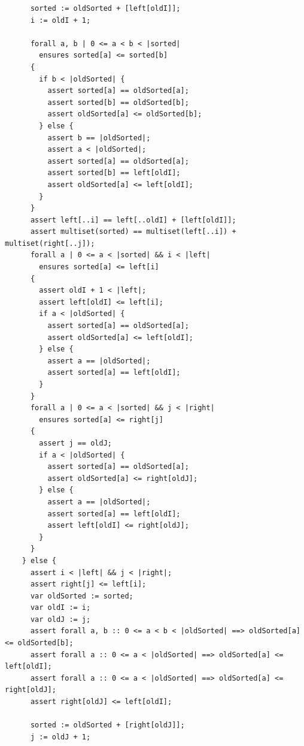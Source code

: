 \documentclass{article}
\begin{document}
\begin{lstlisting}
      sorted := oldSorted + [left[oldI]];
      i := oldI + 1;

      forall a, b | 0 <= a < b < |sorted|
        ensures sorted[a] <= sorted[b]
      {
        if b < |oldSorted| {
          assert sorted[a] == oldSorted[a];
          assert sorted[b] == oldSorted[b];
          assert oldSorted[a] <= oldSorted[b];
        } else {
          assert b == |oldSorted|;
          assert a < |oldSorted|;
          assert sorted[a] == oldSorted[a];
          assert sorted[b] == left[oldI];
          assert oldSorted[a] <= left[oldI];
        }
      }
      assert left[..i] == left[..oldI] + [left[oldI]];
      assert multiset(sorted) == multiset(left[..i]) + multiset(right[..j]);
      forall a | 0 <= a < |sorted| && i < |left|
        ensures sorted[a] <= left[i]
      {
        assert oldI + 1 < |left|;
        assert left[oldI] <= left[i];
        if a < |oldSorted| {
          assert sorted[a] == oldSorted[a];
          assert oldSorted[a] <= left[oldI];
        } else {
          assert a == |oldSorted|;
          assert sorted[a] == left[oldI];
        }
      }
      forall a | 0 <= a < |sorted| && j < |right|
        ensures sorted[a] <= right[j]
      {
        assert j == oldJ;
        if a < |oldSorted| {
          assert sorted[a] == oldSorted[a];
          assert oldSorted[a] <= right[oldJ];
        } else {
          assert a == |oldSorted|;
          assert sorted[a] == left[oldI];
          assert left[oldI] <= right[oldJ];
        }
      }
    } else {
      assert i < |left| && j < |right|;
      assert right[j] <= left[i];
      var oldSorted := sorted;
      var oldI := i;
      var oldJ := j;
      assert forall a, b :: 0 <= a < b < |oldSorted| ==> oldSorted[a] <= oldSorted[b];
      assert forall a :: 0 <= a < |oldSorted| ==> oldSorted[a] <= left[oldI];
      assert forall a :: 0 <= a < |oldSorted| ==> oldSorted[a] <= right[oldJ];
      assert right[oldJ] <= left[oldI];

      sorted := oldSorted + [right[oldJ]];
      j := oldJ + 1;


\end{lstlisting}
\end{document}
